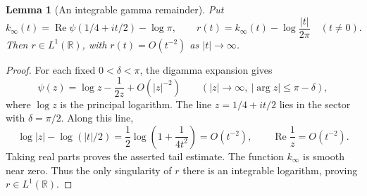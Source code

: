\documentclass[11pt]{article}
\newtheorem{lemma}[theorem]{Lemma}
\theoremstyle{definition}
\theoremstyle{remark}
\numberwithin{equation}{section}
\newcommand{\R}{\mathbb R}
\begin{document}
\begin{lemma}[An integrable gamma remainder]
\label{lem:gamma-integrable-remainder}
Put
\[
 k_\infty(t)=\operatorname{Re}\psi(1/4+it/2)-\log\pi,
 \qquad
 r(t)=k_\infty(t)-\log\frac{|t|}{2\pi}\quad(t\ne0).
\]
Then $r\in L^1(\R)$, with $r(t)=O(t^{-2})$ as $|t|\to\infty$.
\end{lemma}
\begin{proof}
For each fixed $0<\delta<\pi$, the digamma expansion
\cite[\S5.11(i), equation (5.11.2)]{DLMF} gives
\[
 \psi(z)=\log z-\frac1{2z}+O(|z|^{-2})
 \qquad(|z|\to\infty,\ |\arg z|\leq\pi-\delta),
\]
where $\log z$ is the principal logarithm.
The line $z=1/4+it/2$ lies in the sector with $\delta=\pi/2$.
Along this line,
\[
 \log|z|-\log(|t|/2)
   =\frac12\log\left(1+\frac1{4t^2}\right)=O(t^{-2}),
 \qquad \operatorname{Re}\frac1z=O(t^{-2}).
\]
Taking real parts proves the asserted tail estimate.
The function $k_\infty$ is smooth near zero.  Thus the only singularity
of $r$ there is an integrable logarithm, proving $r\in L^1(\R)$.
\end{proof}
\end{document}
